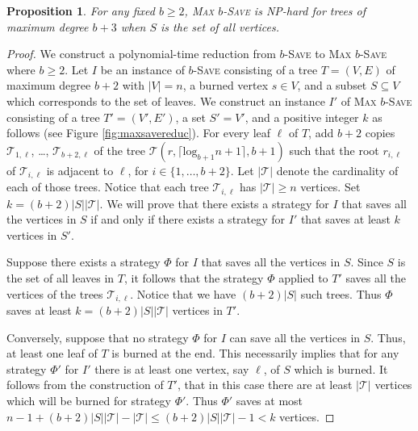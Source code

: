 \documentclass[10pt]{article}
\newtheorem{proposition}{Proposition}
\begin{document}
 \begin{proposition}
 For any fixed $b \geq 2$, \textsc{Max $b$-Save} is NP-hard for
 trees of maximum degree $b+3$ when $S$ is the set of all vertices.
 \end{proposition}

\begin{proof}
 We construct a polynomial-time reduction from \textsc{$b$-Save} to \textsc{Max $b$-Save} where $b \geq 2$.  
 Let $I$ be an instance of \textsc{$b$-Save} consisting of a tree
 $T=(V,E)$ of maximum degree $b+2$ with $|V| = n$, a burned vertex $s \in V$, and a subset $S \subseteq V$ which corresponds
 to the set of leaves. We construct an instance $I'$ of
 \textsc{Max $b$-Save} consisting of a tree $T'=(V', E')$, a set $S' = V'$, and a positive integer $k$ as follows (see Figure \ref{fig:maxsavereduc}). For every leaf $\ell$ of $T$, add $b+2$ copies $\mathcal{T}_{1,\ell}$, \ldots, $\mathcal{T}_{b+2,\ell}$ of the tree $\mathcal{T}(r, \lceil \mbox{log}_{b+1} n+1 \rceil, b+1)$ such that the root $r_{i,\ell}$ of $\mathcal{T}_{i,\ell}$ is adjacent to $\ell$, for $i \in \{1,\ldots,b+2\}$. Let $|\mathcal{T}|$ denote the cardinality of each of those trees. Notice that each tree $\mathcal{T}_{i,\ell}$ has $|\mathcal{T}| \geq n$ vertices. Set $k = (b+2)|S||\mathcal{T}|$. We will prove that there exists a strategy for $I$ that saves all the vertices in $S$ if and only if there exists a strategy for $I'$ that saves at least $k$ vertices in $S'$.

 Suppose there exists a strategy $\Phi$ for $I$ that saves all the vertices in $S$. Since $S$ is the set of all
 leaves in $T$, it follows that the strategy $\Phi$ applied to $T'$ saves all the vertices of the trees $\mathcal{T}_{i,\ell}$. Notice that we have $(b+2)|S|$ such trees. Thus $\Phi$ saves at least $k=(b+2)|S||\mathcal{T}|$ vertices in $T'$.

Conversely, suppose that no strategy $\Phi$ for $I$ can save all the vertices in $S$. Thus, at least one leaf of $T$ is burned at the end. This necessarily implies that for any strategy $\Phi'$ for $I'$ there is at least one vertex, say $\ell$, of $S$ which is burned. It follows from the construction of $T'$, that in this case there are at least $|\mathcal{T}|$ vertices which will be burned for strategy $\Phi'$. Thus $\Phi'$ saves at most $n-1 + (b+2)|S||\mathcal{T}| - |\mathcal{T}| \leq (b+2)|S||\mathcal{T}| - 1 < k$ vertices.
\end{proof}
\end{document}
